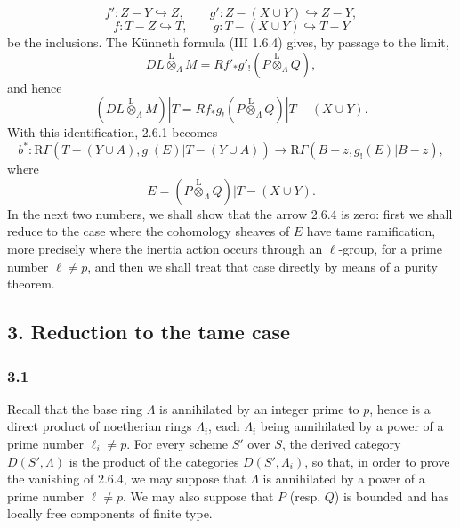 \documentclass[11pt]{article}
\providecommand{\lten}{\overset{\mathrm L}{\otimes}}
\providecommand{\lten}{\overset{\mathrm L}{\otimes}}
\providecommand{\lten}{\overset{\mathrm L}{\otimes}}
\providecommand{\lten}{\overset{\mathrm L}{\otimes}}
\providecommand{\lten}{\overset{\mathrm L}{\otimes}}
\providecommand{\lten}{\overset{\mathrm L}{\otimes}}
\begin{document}
\[
f':Z-Y\hookrightarrow Z,\qquad
g':Z-(X\cup Y)\hookrightarrow Z-Y,
\]
\[
f:T-Z\hookrightarrow T,\qquad
g:T-(X\cup Y)\hookrightarrow T-Y
\]
be the inclusions. The Künneth formula (III 1.6.4) gives, by passage to the limit,
\[
DL\lten_{\Lambda}M=Rf'_*g'_!(P\lten_{\Lambda}Q),
\]
and hence
\begin{equation}
(DL\lten_{\Lambda}M)|T=Rf_*g_!(P\lten_{\Lambda}Q)|T-(X\cup Y).
\tag{2.6.3}
\end{equation}
With this identification, 2.6.1 becomes
\begin{equation}
b^*:\mathrm R\Gamma(T-(Y\cup A),g_!(E)|T-(Y\cup A))
 \longrightarrow \mathrm R\Gamma(B-z,g_!(E)|B-z),
\tag{2.6.4}
\end{equation}
where
\[
E=(P\lten_{\Lambda}Q)|T-(X\cup Y).
\]
In the next two numbers, we shall show that the arrow 2.6.4 is zero: first we shall reduce to the case where the cohomology sheaves of $E$ have tame ramification, more precisely where the inertia action occurs through an $\ell$-group, for a prime number $\ell\ne p$, and then we shall treat that case directly by means of a purity theorem.

\subsection*{3. Reduction to the tame case}

\subsubsection*{3.1}
Recall that the base ring $\Lambda$ is annihilated by an integer prime to $p$, hence is a direct product of noetherian rings $\Lambda_i$, each $\Lambda_i$ being annihilated by a power of a prime number $\ell_i\ne p$. For every scheme $S'$ over $S$, the derived category $D(S',\Lambda)$ is the product of the categories $D(S',\Lambda_i)$, so that, in order to prove the vanishing of 2.6.4, we may suppose that $\Lambda$ is annihilated by a power of a prime number $\ell\ne p$. We may also suppose that $P$ (resp. $Q$) is bounded and has locally free components of finite type.
\end{document}
